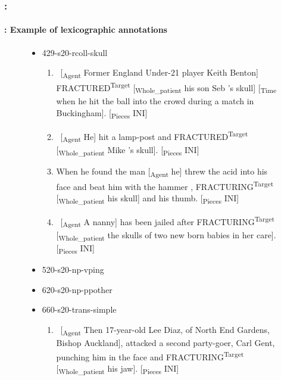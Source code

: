 \documentclass[xcolor=table]{beamer}
\begin{document}
\begin{frame}
	\frametitle{\insertshortsubtitle: \insertsection}
	\framesubtitle{\insertsubsection: Example of lexicographic annotations}
	
	\vskip-5pt
	\begin{figure}
		\begin{tcolorbox}[colback=white, colframe=blue, boxrule=1pt, text width=.91\textwidth]
			\tiny\bfseries
			\vspace{-6pt}
		\begin{itemize}
			\item 429-s20-rcoll-skull
			\begin{enumerate}\tiny
				\item \ [\textsubscript{\color{red}Agent} Former England Under-21 player Keith Benton] FRACTURED\textsuperscript{\color{red}Target} [\textsubscript{\color{red}Whole\_patient} his son Seb 's skull] [\textsubscript{\color{red}Time} when he hit the ball into the crowd during a match in Buckingham]. [\textsubscript{\color{red}Pieces} INI] 
				\item \ [\textsubscript{\color{red}Agent} He] hit a lamp-post and FRACTURED\textsuperscript{\color{red}Target} [\textsubscript{\color{red}Whole\_patient} Mike 's skull]. [\textsubscript{\color{red}Pieces} INI] 
				\item When he found the man [\textsubscript{\color{red}Agent} he] threw the acid into his face and beat him with the hammer , FRACTURING\textsuperscript{\color{red}Target} [\textsubscript{\color{red}Whole\_patient} his skull] and his thumb. [\textsubscript{\color{red}Pieces} INI] 
				\item \ [\textsubscript{\color{red}Agent} A nanny] has been jailed after FRACTURING\textsuperscript{\color{red}Target} [\textsubscript{\color{red}Whole\_patient} the skulls of two new born babies in her care]. [\textsubscript{\color{red}Pieces} INI] 
			\end{enumerate}
			\item 520-s20-np-vping
			\item 620-s20-np-ppother
			\item 660-s20-trans-simple
			\begin{enumerate}\tiny
				\item \ [\textsubscript{\color{red}Agent} Then 17-year-old Lee Diaz, of North End Gardens, Bishop Auckland], attacked a second party-goer, Carl Gent, punching him in the face and FRACTURING\textsuperscript{\color{red}Target} [\textsubscript{\color{red}Whole\_patient} his jaw]. [\textsubscript{\color{red}Pieces} INI] 
			\end{enumerate}
			

\end{itemize}
\end{tcolorbox}
\end{figure}
\end{frame}
\end{document}
